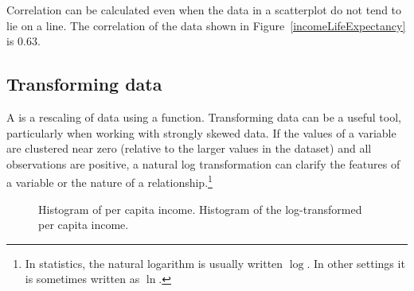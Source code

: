 Correlation can be calculated even when the data in a scatterplot do not tend to lie on a line. The correlation of the data shown in Figure~\ref{incomeLifeExpectancy} is $0.63$.


\subsection{Transforming data}
\label{transformingDataSubsection}



A  is a rescaling of data using a function. Transforming data can be a useful tool, particularly when working with strongly skewed data. If the values of a variable are clustered near zero (relative to the larger values in the dataset) and all observations are positive, a natural log transformation can clarify the features of a variable or the nature of a relationship.\footnote{In statistics, the natural logarithm is usually written $\log$. In other settings it is sometimes written as  $\ln$.}

\begin{figure}[ht]
	\centering
	\caption{ Histogram of per capita income.  Histogram of the log-transformed per capita income.}
	\label{incomeHistTransform}
\end{figure}

